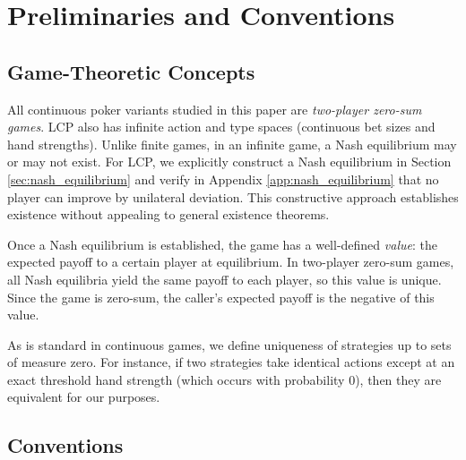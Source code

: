 \documentclass[../../main/main.tex]{subfiles}
\begin{document}
\section{Preliminaries and Conventions}

\subsection{Game-Theoretic Concepts}

All continuous poker variants studied in this paper are \textit{two-player zero-sum games}. LCP also has infinite action and type spaces (continuous bet sizes and hand strengths). Unlike finite games, in an infinite game, a Nash equilibrium may or may not exist. For LCP, we explicitly construct a Nash equilibrium in Section \ref{sec:nash_equilibrium} and verify in Appendix \ref{app:nash_equilibrium} that no player can improve by unilateral deviation. This constructive approach establishes existence without appealing to general existence theorems.

Once a Nash equilibrium is established, the game has a well-defined \textit{value}: the expected payoff to a certain player at equilibrium. In two-player zero-sum games, all Nash equilibria yield the same payoff to each player, so this value is unique. Since the game is zero-sum, the caller's expected payoff is the negative of this value.

As is standard in continuous games, we define uniqueness of strategies up to sets of measure zero. For instance, if two strategies take identical actions except at an exact threshold hand strength (which occurs with probability 0), then they are equivalent for our purposes.

\subsection{Conventions}
\end{document}
